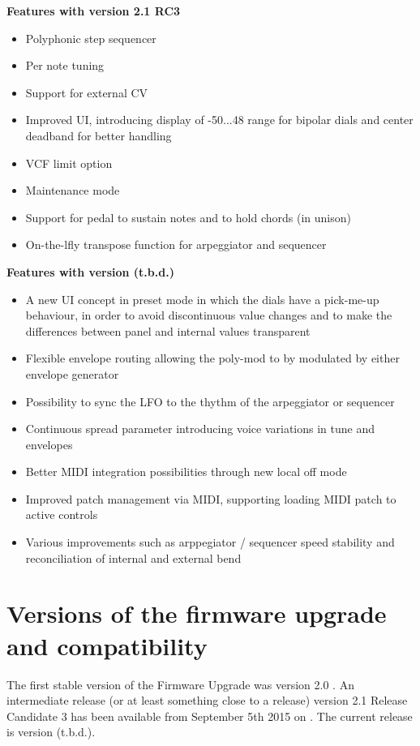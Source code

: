 \documentclass[landscape, 11pt, oneside]{report}
\newenvironment{flowtext}{\addmargin[0cm]{7cm}}{\endaddmargin} %
\begin{document}
\begin{flowtext}
\textbf{Features with version 2.1 RC3}
  
\begin{itemize}
  \item Polyphonic step sequencer
  \item Per note tuning
  \item Support for external CV
  \item Improved UI, introducing display of -50...48 range for bipolar dials and center deadband for better handling  
  \item VCF limit option
  \item Maintenance mode
  \item Support for pedal to sustain notes and to hold chords (in unison)
  \item On-the-lfly transpose function for arpeggiator and sequencer
\end{itemize}

\textbf{Features with version (t.b.d.)}
  
\begin{itemize}
  \item A new UI concept in preset mode in which the dials have a pick-me-up behaviour, in order to avoid discontinuous value changes and to make the differences between panel and internal values transparent 
  \item Flexible envelope routing allowing the poly-mod to by modulated by either envelope generator
  \item Possibility to sync the LFO to the thythm of the arpeggiator or sequencer
  \item Continuous spread parameter introducing voice variations in tune and envelopes
  \item Better MIDI integration possibilities through new local off mode
  \item Improved patch management via MIDI, supporting loading MIDI patch to active controls 
  \item Various improvements such as arppegiator / sequencer speed stability and reconciliation of internal and external bend  
\end{itemize}

\section{Versions of the firmware upgrade and compatibility}

The first stable version of the Firmware Upgrade was version 2.0 \cite{versiontwo}. An intermediate release (or at least something close to a release) version 2.1 Release Candidate 3 has been available from September 5th 2015 on \cite{gligli}. The current release is version (t.b.d.). 


\end{flowtext}
\end{document}
